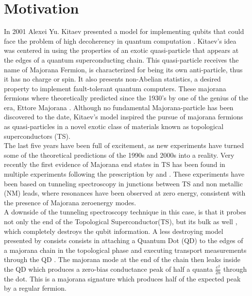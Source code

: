 \chapter{Motivation}

In 2001 Alexei Yu. Kitaev presented a model for implementing qubits
that could face the problem of high decoherency in quantum computation \citep{kitaev_unpaired_2001}. Kitaev's idea was centered in using the properties of an exotic quasi-particle that appears at the edges of a quantum superconducting chain. This quasi-particle receives the name of Majorana Fermion, is characterized for being its own anti-particle, thus it has no charge or spin. It also presents non-Abelian statistics, a desired property to implement fault-tolerant quantum computers\citep{kitaev_fault-tolerant_2003}. These majorana fermions where theoretically predicted since the 1930's by one of the genius of the era, Ettore Majorana \citep{wilczek_majorana_2009}.
Although no fundamental Majorana-particle has been discovered to the
date, Kitaev's model inspired the pursue of majorana fermions as
quasi-particles in a novel exotic class of materials known as topological
superconductors (TS)\citep{fu_superconducting_2008,sato_non-abelian_2009,alicea_new_2012}.
\\

The last five years have been full of excitement, as new experiments
have turned some of the theoretical predictions of the 1990s and 2000s
into a reality. Very recently the first evidence of Majorana end states
in TS has been found in multiple experiments \citep{mourik_signatures_2012,das_zero-bias_2012,deng_anomalous_2012}
following the prescription by \citet{oreg_helical_2010} and \citet{lutchyn_majorana_2010}.
These experiments have been based on tunneling spectroscopy in junctions
between TS and non metallic (NM) leads, where resonances have been
observed at zero energy, consistent with the presence of Majorana
zero\textendash energy modes.\\

A downside of the tunneling spectroscopy technique in this case, is
that it probes not only the end of the Topological Superconductor(TS), but its bulk as well ,
which completely destroys the qubit information. A less destroying
model presented by \citet{liu_detecting_2011} consists consists in attaching a Quantum Dot (QD) to the edges of a majorana chain in the topological phase and executing transport measurements through the QD \cite{liu_detecting_2011} . The majorana mode at the end of the chain then leaks inside the QD \cite{vernek_subtle_2014} which produces a zero-bias conductance peak of half a quanta $\frac{e^{2}}{2h}$ through the dot. This is a majorana signature which produces half of the expected peak by a regular fermion.\\


